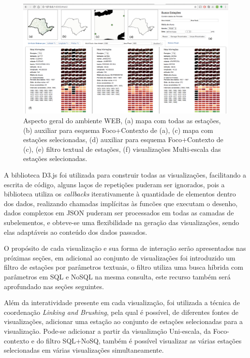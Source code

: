 \documentclass[article,11pt,oneside,a4paper]{abntex2} %
\begin{document}
	\begin{figure}[!h]
		\centering
		\includegraphics[width=1\textwidth]{figuras/site3}
		\caption{Aspecto geral do ambiente WEB, (a) mapa com todas as estações, (b) auxiliar para esquema Foco+Contexto de (a), (c) mapa com estações selecionadas, (d) auxiliar para esquema Foco+Contexto de (c), (e) filtro textual de estações, (f) visualizações Multi-escala das estações selecionadas.}
		\label{site}
	\end{figure}

	A biblioteca D3.js foi utilizada para construir todas as visualizações, facilitando a escrita de código, alguns laços de repetições puderam ser ignorados, pois a biblioteca utiliza os \textit{callbacks} iterativamente à quantidade de elementos dentro dos dados, realizando chamadas implícitas às funcões que executam o desenho, dados complexos em JSON puderam ser processados em todas as camadas de subelementos, e obteve-se uma flexibilidade na geração das visualizações, sendo elas adaptáveis ao conteúdo dos dados passados.
	 
	 O propósito de cada visualização e sua forma de interação serão apresentados nas próximas seções, em adicional ao conjunto de visualizações foi introduzido um filtro de estações por parâmetros textuais, o filtro utiliza uma busca híbrida com parâmetros em SQL e NoSQL na mesma consulta, este recurso também será aprofundado nas seções seguintes.
	
	Além da interatividade presente em cada visualização, foi utilizada a técnica de coordenação \textit{Linking and Brushing}, pela qual é possível, de diferentes fontes de visualizações, adicionar uma estação ao conjunto de estações selecionadas para a visualização. Pode-se adicionar a partir da visualização Uni-escala, da Foco-contexto e do filtro SQL+NoSQ, também é possível visualizar as várias estações selecionadas em várias visualizações simultaneamente.
	
\end{document}

